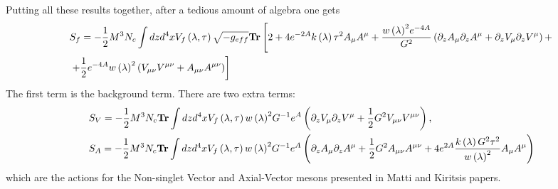 \documentclass[10 pt]{article}
\begin{document}
Putting all these results together, after a tedious amount of algebra one gets
\begin{align}
&S_f = - \frac{1}{2} M^3 N_c \int dz d^4 x V_f \left(\lambda, \tau \right) \sqrt{- g_{eff}} \bold{Tr} \left[ 2 + 4 e^{-2A} k\left( \lambda \right) \tau^2 A_\mu A^\mu + \frac{{w\left(\lambda\right)}^2 e^{-4A}}{G^2} \left( \partial_z A_\mu \partial_z A^\mu +  \partial_z V_\mu \partial_z V^\mu \right) + \right. \\
&\left. + \frac{1}{2} e^{-4A} {w\left(\lambda\right)}^2 \left( V_{\mu \nu}V^{\mu \nu} + A_{\mu \nu} A^{\mu \nu} \right) \right]
\end{align}
The first term is the background term. There are two extra terms:
\begin{align}
&S_V = - \frac{1}{2} M^3 N_c \bold{Tr} \int dz d^4x V_{f} \left( \lambda, \tau \right) {w\left(\lambda\right)}^2 G^{-1} e^{A} \left( \partial_z V_\mu \partial_z V^\mu + \frac{1}{2} G^2 V_{\mu \nu} V^{\mu \nu} \right), \\
& S_A = - \frac{1}{2} M^3 N_c \bold{Tr} \int dz d^4 x V_{f} \left( \lambda, \tau \right) {w\left(\lambda\right)}^2 G^{-1} e^{A} \left( \partial_z A_\mu \partial_z A^\mu + \frac{1}{2} G^2 A_{\mu \nu} A^{\mu \nu} + 4 e^{2A} \frac{k\left(\lambda\right) G^2 \tau^2}{{w\left(\lambda\right)}^2} A_\mu A^\mu \right)
\end{align}
which are the actions for the Non-singlet Vector and Axial-Vector mesons presented in Matti and Kiritsis papers.
\end{document}
